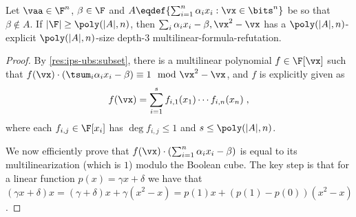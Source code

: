 \documentclass{toc}
\begin{document}
\begin{proposition}\label{res:ips-ubs:subset:mult-form}
        Let $\vaa\in\F^n$, $\beta\in\F$ and $A\eqdef\{\sum_{i=1}^n \alpha_i x_i : \vx\in\bits^n\}$ be so that $\beta\notin A$.  If $|\F|\ge \poly(|A|,n)$, then $\sum_i \alpha_ix_i-\beta,\vx^2-\vx$ has a $\poly(|A|,n)$-explicit $\poly(|A|,n)$-size depth-3 multilinear-formula-\lIPS refutation.
\end{proposition}
\begin{proof}
        By \autoref{res:ips-ubs:subset}, there is a multilinear polynomial $f\in\F[\vx]$ such that $f(\vx)\cdot \left(\tsum_i \alpha_i x_i-\beta\right)\equiv 1\mod  \vx^2-\vx$, and $f$ is explicitly given as
        \[
                f(\vx)=\sum_{i=1}^s f_{i,1}(x_1)\cdots f_{i,n}(x_n)
                \;,
        \]
        where each $f_{i,j}\in\F[x_i]$ has $\deg f_{i,j}\le 1$ and $s\le \poly(|A|,n)$.

        We now efficiently prove that $f(\vx)\cdot (\sum_{i=1}^n \alpha_i x_i-\beta)$ is equal to its multilinearization (which is $1$) modulo the Boolean cube. The key step is that for a linear function $p(x)=\gamma x+\delta$ we have that $(\gamma x+\delta)x=(\gamma+\delta)x+\gamma(x^2-x)=p(1)x+(p(1)-p(0))(x^2-x)$.


\end{proof}
\end{document}
